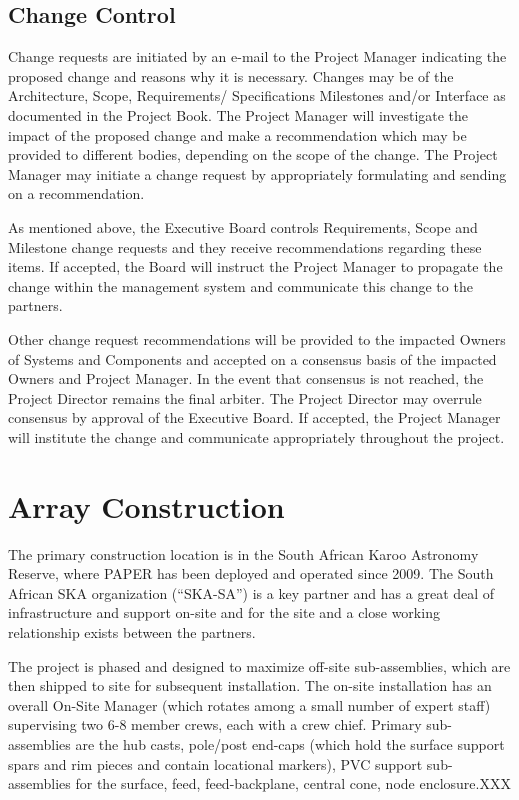 \documentclass[preprint]{aastex}
\begin{document}
\subsection{Change Control}
\label{sec:changecontrol}
Change requests are initiated by an e-mail to the Project Manager indicating the proposed change
and reasons why it is necessary.  Changes may be of the Architecture, Scope, Requirements/ Specifications
Milestones and/or Interface as documented in the Project Book.  The Project Manager will investigate the 
impact of the proposed change and make a recommendation which may be provided to different bodies, 
depending on the scope of the change.  The Project Manager may initiate a change request by appropriately 
formulating and sending on a recommendation.

As mentioned above, the Executive Board controls Requirements, Scope and Milestone change requests
and they receive recommendations regarding these items.  If accepted, the Board will instruct the Project Manager to 
propagate the change within the management system and communicate this change to the partners.

Other change request recommendations will be provided to the impacted Owners of Systems and
Components and accepted on a consensus basis of the impacted Owners and Project Manager.  
In the event that consensus is not reached, the Project Director remains the final arbiter.  The Project 
Director may overrule consensus by approval of the Executive Board.  If accepted, the Project Manager 
will institute the change and communicate appropriately throughout the project.

\section{Array Construction}
\label{sec:construction}
The primary construction location is in the South African Karoo Astronomy Reserve, where PAPER has been deployed
and operated since 2009.  The South African SKA organization (``SKA-SA'') is a key partner and has a great deal of
infrastructure and support on-site and for the site and a close working relationship exists between the partners.

The project is phased and designed to maximize off-site sub-assemblies, which are then shipped to site for subsequent
installation.  The on-site installation has an overall On-Site Manager (which rotates among a small number of expert
staff) supervising two 6-8 member crews, each with a crew chief.  Primary sub-assemblies are the hub casts, pole/post end-caps 
(which hold the surface support spars and rim pieces and contain locational markers), PVC support sub-assemblies 
for the surface, feed, feed-backplane, central cone, node enclosure.XXX
\end{document}

